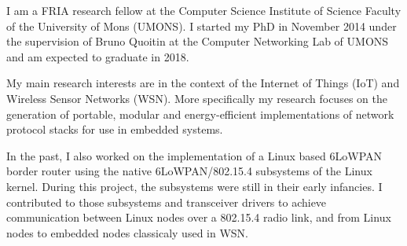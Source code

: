 I am a FRIA research fellow at the Computer Science
Institute of Science Faculty of the University of Mons
(UMONS). I started my PhD in November 2014 under the
supervision of Bruno Quoitin at the Computer Networking Lab
of UMONS and am expected to graduate in 2018.

My main research interests are in the context of the
Internet of Things (IoT) and Wireless Sensor Networks
(WSN). More specifically my research focuses on the
generation of portable, modular and energy-efficient
implementations of network protocol stacks for use in
embedded systems.

In the past, I also worked on the implementation of a Linux
based 6LoWPAN border router using the native
6LoWPAN/802.15.4 subsystems of the Linux kernel. During this
project, the subsystems were still in their early infancies.
I contributed to those subsystems and transceiver drivers to
achieve communication between Linux nodes over a 802.15.4
radio link, and from Linux nodes to embedded nodes
classicaly used in WSN.
